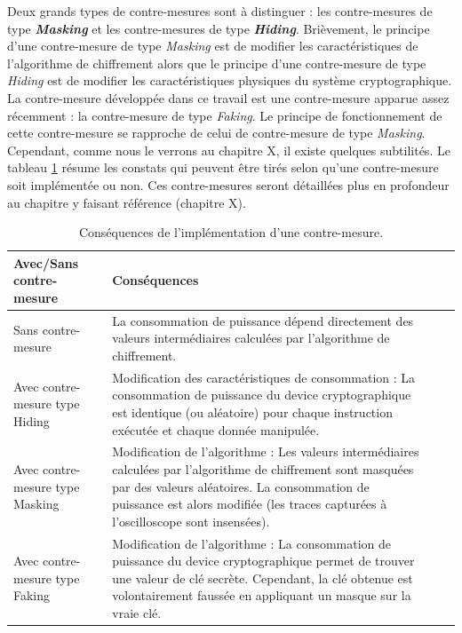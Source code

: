 \documentclass[oneside]{book}
\begin{document}
Deux grands types de contre-mesures sont à distinguer : les contre-mesures de type \textbf{\textit{Masking}} et les contre-mesures de type \textbf{\textit{Hiding}}. Brièvement, le principe d'une contre-mesure de type \textit{Masking} est de modifier les caractéristiques de l'algorithme de chiffrement alors que le principe d'une contre-mesure de type \textit{Hiding} est de modifier les caractéristiques physiques du système cryptographique. La contre-mesure développée dans ce travail est une contre-mesure apparue assez récemment : la contre-mesure de type \textit{Faking}. Le principe de fonctionnement de cette contre-mesure se rapproche de celui de contre-mesure de type \textit{Masking}. Cependant, comme nous le verrons au chapitre X, il existe quelques subtilités. Le tableau \ref{fig:intro2} résume les constats qui peuvent être tirés selon qu'une contre-mesure soit implémentée ou non. Ces contre-mesures seront détaillées plus en profondeur au chapitre y faisant référence (chapitre X).

\begin{table}
	\centering
	\begin{tabular}{|l|m{9cm}|l|m{3cm}|}
    		\hline
   		 Avec/Sans contre-mesure & Conséquences \\ \hline
    		Sans contre-mesure & La consommation de puissance dépend directement des valeurs intermédiaires calculées par l’algorithme de chiffrement. \\ \hline
		Avec contre-mesure type Hiding & Modification des caractéristiques de consommation : La consommation de puissance du device cryptographique est identique (ou aléatoire) pour chaque instruction exécutée et chaque donnée manipulée. \\ \hline
    		Avec contre-mesure type Masking & Modification de l’algorithme : Les valeurs intermédiaires calculées par l’algorithme de chiffrement sont masquées par des valeurs aléatoires. La consommation de puissance est alors modifiée (les traces capturées à l’oscilloscope sont insensées). \\ \hline
		Avec contre-mesure type Faking & Modification de l’algorithme : La consommation de puissance du device cryptographique permet de trouver une valeur de clé secrète. Cependant, la clé obtenue est volontairement faussée en appliquant un masque sur la vraie clé. \\ \hline
 	\end{tabular}
 	\caption{Conséquences de l'implémentation d'une contre-mesure.}
 	\label{fig:intro2}
\end{table}
\end{document}
